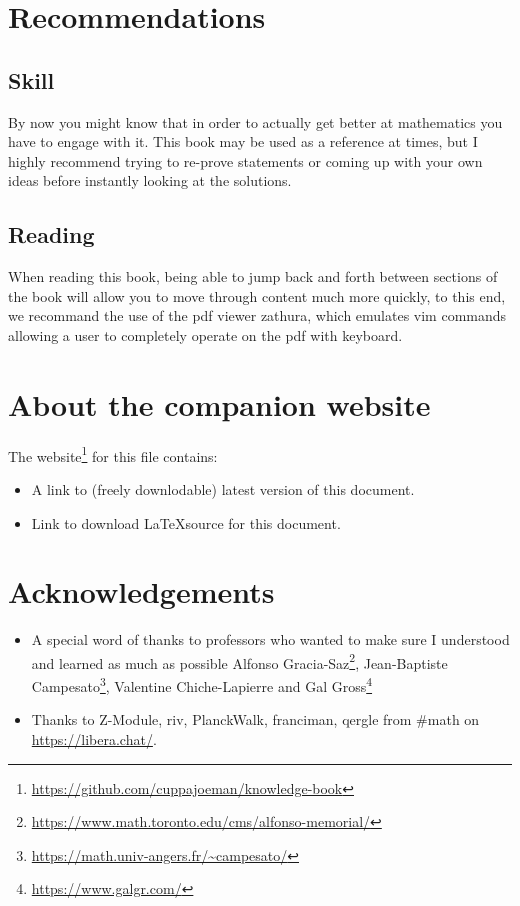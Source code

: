 \section*{Recommendations}
\subsection*{Skill}
By now you might know that in order to actually get better at mathematics you
have to engage with it. This book may be used as a reference at times, but I
highly recommend trying to re-prove statements or coming up with your own ideas
before instantly looking at the solutions.
\subsection*{Reading}
When reading this book, being able to jump back and forth between sections of
the book will allow you to move through content much more quickly, to this end,
we recommand the use of the pdf viewer zathura, which emulates vim commands
allowing a user to completely operate on the pdf with keyboard.

\section*{About the companion website}
The website\footnote{\url{https://github.com/cuppajoeman/knowledge-book}} for
this file contains:
\begin{itemize}
  \item A link to (freely downlodable) latest version of this document.
  \item Link to download \LaTeX source for this document.
\end{itemize}

\section*{Acknowledgements}
\begin{itemize}
    \item A special word of thanks to professors who wanted to make sure I
    understood and learned as much as possible Alfonso
    Gracia-Saz\footnote{\url{https://www.math.toronto.edu/cms/alfonso-memorial/}},
    Jean-Baptiste
    Campesato\footnote{\url{https://math.univ-angers.fr/~campesato/}}, Valentine
    Chiche-Lapierre and Gal Gross\footnote{\url{https://www.galgr.com/}}
    \item Thanks to Z-Module, riv, PlanckWalk, franciman, qergle from \#math on
    \url{https://libera.chat/}.
\end{itemize}

